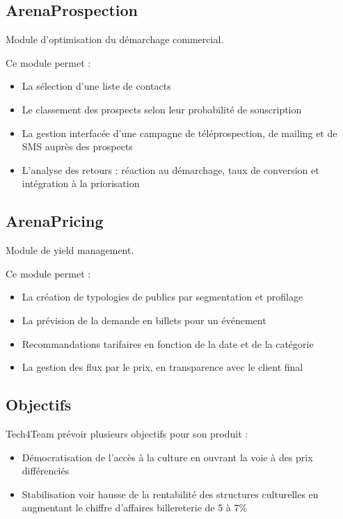 \subsection{ArenaProspection}
Module d’optimisation du démarchage commercial.

Ce module permet :
\begin{itemize}
  \item[\textbullet] La sélection d’une liste de contacts
  \item[\textbullet] Le classement des prospects selon leur probabilité de souscription
  \item[\textbullet] La gestion interfacée d’une campagne de téléprospection, de mailing et de SMS auprès des prospects
  \item[\textbullet] L'analyse des retours : réaction au démarchage, taux de conversion et intégration à la priorisation
\end{itemize}

\subsection{ArenaPricing}
Module de yield management.

Ce module permet :
\begin{itemize}
  \item[\textbullet] La création de typologies de publics par segmentation et profilage
  \item[\textbullet] La prévision de la demande en billets pour un événement
  \item[\textbullet] Recommandations tarifaires en fonction de la date et de la catégorie
  \item[\textbullet] La gestion des flux par le prix, en transparence avec le client final
\end{itemize}

\subsection{Objectifs}
Tech4Team prévoir plusieurs objectifs pour son produit :
\begin{itemize}
	\item[\textbullet] Démocratisation de l'accès à la culture en ouvrant la voie à des prix différenciés
	\item[\textbullet] Stabilisation voir hausse de la rentabilité des structures culturelles en augmentant le chiffre d'affaires billereterie de 5 à 7\%
\end{itemize}

